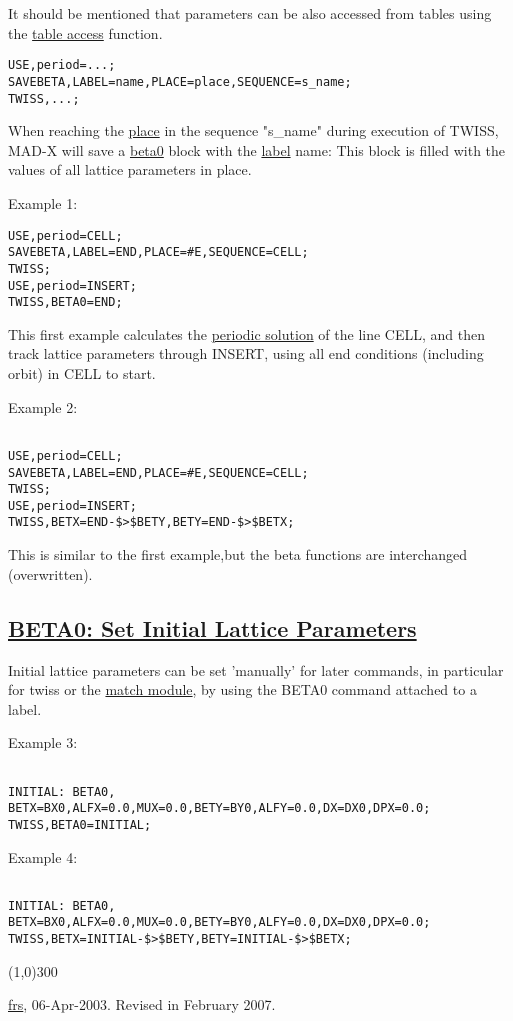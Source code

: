 It should be mentioned that parameters can be also accessed from tables using the \href{../Introduction/expression.html#table}{table access} function.


\begin{verbatim}
USE,period=...;
SAVEBETA,LABEL=name,PLACE=place,SEQUENCE=s_name;
TWISS,...;
\end{verbatim} When reaching the \href{../control/general.html#place}{place} in the sequence "s\_name" during execution of TWISS, MAD-X will save a \hyperlink{beta0}{beta0} block with the \href{../Introduction/label.html}{label} name: This block is filled with the values of all lattice parameters in place. 

Example 1: 
\begin{verbatim}
USE,period=CELL;
SAVEBETA,LABEL=END,PLACE=#E,SEQUENCE=CELL;
TWISS;
USE,period=INSERT;
TWISS,BETA0=END;
\end{verbatim} This first example calculates the \hyperlink{periodic}{periodic solution} of the line CELL, and then track lattice parameters through INSERT, using all end conditions (including orbit) in CELL to start. 

Example 2: 
\begin{verbatim}

USE,period=CELL;
SAVEBETA,LABEL=END,PLACE=#E,SEQUENCE=CELL;
TWISS;
USE,period=INSERT;
TWISS,BETX=END-$>$BETY,BETY=END-$>$BETX;
\end{verbatim}

This is similar to the first example,but the beta functions are interchanged (overwritten).  

\subsection{\href{beta0cmd}{BETA0: Set Initial Lattice Parameters}} Initial lattice parameters can be set 'manually' for later commands, in particular for twiss or the \href{../match/match.html}{match module}, by using the BETA0 command attached to a label. 

Example 3: 
\begin{verbatim}

INITIAL: BETA0, BETX=BX0,ALFX=0.0,MUX=0.0,BETY=BY0,ALFY=0.0,DX=DX0,DPX=0.0;
TWISS,BETA0=INITIAL;
\end{verbatim}

Example 4: 
\begin{verbatim}

INITIAL: BETA0, BETX=BX0,ALFX=0.0,MUX=0.0,BETY=BY0,ALFY=0.0,DX=DX0,DPX=0.0;
TWISS,BETX=INITIAL-$>$BETY,BETY=INITIAL-$>$BETX;
\end{verbatim}

\line(1,0){300}

\href{http://cern.ch/Frank.Schmidt/frs_sign.html}{frs}, 06-Apr-2003. Revised in February 2007. 

